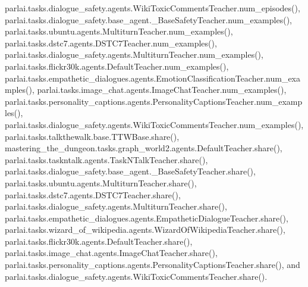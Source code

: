 parlai.\+tasks.\+dialogue\+\_\+safety.\+agents.\+Wiki\+Toxic\+Comments\+Teacher.\+num\+\_\+episodes(), parlai.\+tasks.\+dialogue\+\_\+safety.\+base\+\_\+agent.\+\_\+\+Base\+Safety\+Teacher.\+num\+\_\+examples(), parlai.\+tasks.\+ubuntu.\+agents.\+Multiturn\+Teacher.\+num\+\_\+examples(), parlai.\+tasks.\+dstc7.\+agents.\+D\+S\+T\+C7\+Teacher.\+num\+\_\+examples(), parlai.\+tasks.\+dialogue\+\_\+safety.\+agents.\+Multiturn\+Teacher.\+num\+\_\+examples(), parlai.\+tasks.\+flickr30k.\+agents.\+Default\+Teacher.\+num\+\_\+examples(), parlai.\+tasks.\+empathetic\+\_\+dialogues.\+agents.\+Emotion\+Classification\+Teacher.\+num\+\_\+examples(), parlai.\+tasks.\+image\+\_\+chat.\+agents.\+Image\+Chat\+Teacher.\+num\+\_\+examples(), parlai.\+tasks.\+personality\+\_\+captions.\+agents.\+Personality\+Captions\+Teacher.\+num\+\_\+examples(), parlai.\+tasks.\+dialogue\+\_\+safety.\+agents.\+Wiki\+Toxic\+Comments\+Teacher.\+num\+\_\+examples(), parlai.\+tasks.\+talkthewalk.\+base.\+T\+T\+W\+Base.\+share(), mastering\+\_\+the\+\_\+dungeon.\+tasks.\+graph\+\_\+world2.\+agents.\+Default\+Teacher.\+share(), parlai.\+tasks.\+taskntalk.\+agents.\+Task\+N\+Talk\+Teacher.\+share(), parlai.\+tasks.\+dialogue\+\_\+safety.\+base\+\_\+agent.\+\_\+\+Base\+Safety\+Teacher.\+share(), parlai.\+tasks.\+ubuntu.\+agents.\+Multiturn\+Teacher.\+share(), parlai.\+tasks.\+dstc7.\+agents.\+D\+S\+T\+C7\+Teacher.\+share(), parlai.\+tasks.\+dialogue\+\_\+safety.\+agents.\+Multiturn\+Teacher.\+share(), parlai.\+tasks.\+empathetic\+\_\+dialogues.\+agents.\+Empathetic\+Dialogue\+Teacher.\+share(), parlai.\+tasks.\+wizard\+\_\+of\+\_\+wikipedia.\+agents.\+Wizard\+Of\+Wikipedia\+Teacher.\+share(), parlai.\+tasks.\+flickr30k.\+agents.\+Default\+Teacher.\+share(), parlai.\+tasks.\+image\+\_\+chat.\+agents.\+Image\+Chat\+Teacher.\+share(), parlai.\+tasks.\+personality\+\_\+captions.\+agents.\+Personality\+Captions\+Teacher.\+share(), and parlai.\+tasks.\+dialogue\+\_\+safety.\+agents.\+Wiki\+Toxic\+Comments\+Teacher.\+share().

\mbox{\label{classparlai_1_1tasks_1_1dialogue__safety_1_1agents_1_1MultiturnTeacher_a6ae7a9106d6fbaf0c03f7501975973c6}} 
